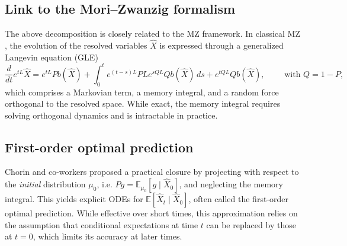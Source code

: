 \documentclass[11pt, a4paper, oneside, reqno]{amsart}
\begin{document}
\subsection{Link to the Mori–Zwanzig formalism}
\noindent The above decomposition is closely related to the MZ framework. In classical MZ \cite{chorin2000MZ,CHORIN2009optimal_prediction_memory,gouasmi2017memory,Givon2005orthogdyn,LIN2021109864}, the evolution of the resolved variables $\hat{X}$ is expressed through a generalized Langevin equation (GLE)
\begin{equation}\label{eq:MZ}
\frac{d}{dt} e^{tL}\hat{X} = e^{tL}Pb(\hat{X}) 
+ \int_0^t e^{(t-s)L}PL e^{sQL} Q b(\hat{X})\,ds
+ e^{tQL}Q b(\hat{X}), \qquad \textrm{ with   } Q=1-P,
\end{equation}
which comprises a Markovian term, a memory integral, and a random force orthogonal to the resolved space. While exact, the memory integral requires solving orthogonal dynamics and is intractable in practice. 
\subsection{First-order optimal prediction}\label{sec:FOP}  
\noindent Chorin and co-workers \cite{chorin2000MZ} proposed a practical closure by projecting with respect to the \emph{initial} distribution $\mu_0$, i.e. $P g=\mathbb{E}_{\mu_0}[g\mid \hat{X}_0]$, and neglecting the memory integral. This yields explicit ODEs for $\mathbb{E}[\hat{X}_t\mid \hat{X}_0]$, often called the first-order optimal prediction. While effective over short times, this approximation relies on the assumption that conditional expectations at time $t$ can be replaced by those at $t=0$, which limits its accuracy  at later times. 
\end{document}
